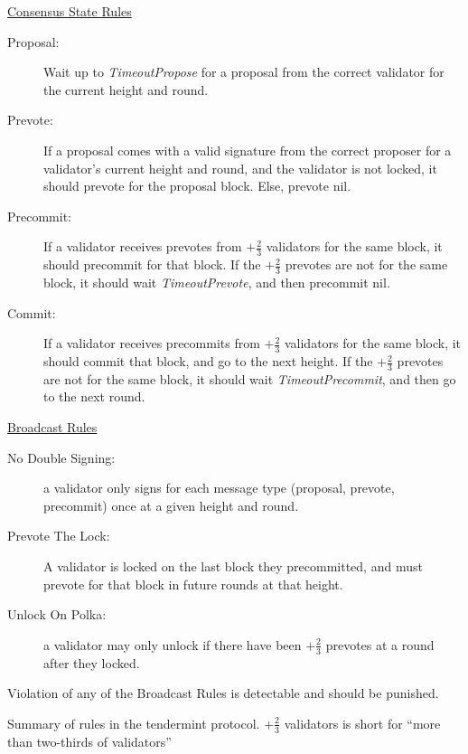 
\underline{Consensus State Rules}
\begin{description}
	\item[Proposal:] Wait up to \emph{TimeoutPropose} for a proposal from the correct validator for the current height and round.
	\item[Prevote:]  If a proposal comes with a valid signature from the correct proposer for a validator’s current height and round, and the validator is not locked, it should prevote for the proposal block. Else, prevote nil.
	\item[Precommit:] If a validator receives prevotes from $+\frac{2}{3}$ validators for the same block, it should precommit for that block. If the $+\frac{2}{3}$ prevotes are not for the same block, it should wait \emph{TimeoutPrevote}, and then precommit nil.
	\item[Commit:] If a validator receives precommits from $+\frac{2}{3}$ validators for the same block, it should commit that block, and go to the next height.  If the $+\frac{2}{3}$ prevotes are not for the same block, it should wait \emph{TimeoutPrecommit}, and then go to the next round.
\end{description}

\underline{Broadcast Rules}
\begin{description}
	\item[No Double Signing:] a validator only signs for each message type (proposal, prevote, precommit) once at a given height and round.
	\item[Prevote The Lock:] A validator is locked on the last block they precommitted, and must prevote for that block in future rounds at that height.
	\item[Unlock On Polka:] a validator may only unlock if there have been $+\frac{2}{3}$ prevotes at a round after they locked. 
\end{description}
Violation of any of the Broadcast Rules is detectable and should be punished.

\caption[Summary of Tendermint protocol rules]{Summary of rules in the tendermint protocol. 
$+\frac{2}{3}$ validators is short for ``more than two-thirds of validators''}
